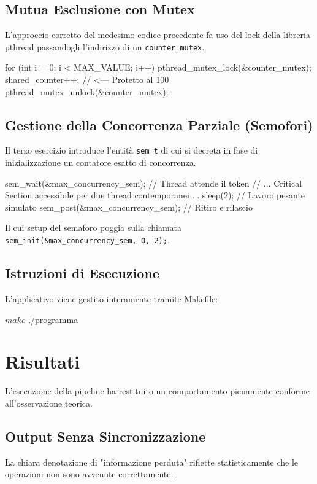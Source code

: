 \documentclass[a4paper,12pt]{article}
\begin{document}
\subsection{Mutua Esclusione con Mutex}
L'approccio corretto del medesimo codice precedente fa uso del lock della libreria pthread passandogli l'indirizzo di un \texttt{counter\_mutex}.
\begin{ccode}
for (int i = 0; i < MAX_VALUE; i++) {
    pthread_mutex_lock(&counter_mutex);
    shared_counter++; // <--- Protetto al 100%
    pthread_mutex_unlock(&counter_mutex);
}
\end{ccode}

\subsection{Gestione della Concorrenza Parziale (Semofori)}
Il terzo esercizio introduce l'entità \texttt{sem\_t} di cui si decreta in fase di inizializzazione un contatore esatto di concorrenza.
\begin{ccode}
sem_wait(&max_concurrency_sem); // Thread attende il token
// ... Critical Section accessibile per due thread contemporanei ...
sleep(2); // Lavoro pesante simulato
sem_post(&max_concurrency_sem); // Ritiro e rilascio
\end{ccode}
Il cui setup del semaforo poggia sulla chiamata \texttt{sem\_init(\&max\_concurrency\_sem, 0, 2);}.


\subsection{Istruzioni di Esecuzione}
L'applicativo viene gestito interamente tramite Makefile:
\begin{terminal}
$ make
$ ./programma
\end{terminal}

\section{Risultati}
L'esecuzione della pipeline ha restituito un comportamento pienamente conforme all'osservazione teorica.

\subsection{Output Senza Sincronizzazione}
La chiara denotazione di "informazione perduta" riflette statisticamente che le operazioni non sono avvenute correttamente.
\end{document}
